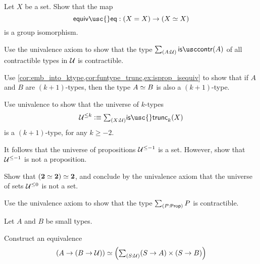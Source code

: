 \begin{exercises}
\item Let $X$ be a set. Show that the map
  \begin{equation*}
    \mathsf{equiv\usc{}eq} : (X=X)\to (\eqv{X}{X})
  \end{equation*}
  is a group isomorphism.
\item \label{ex:istrunc_UUtrunc}
\begin{subexenum}
\item Use the univalence axiom to show that the type $\sm{A:\UU}\iscontr(A)$ of all contractible types in $\mathcal{U}$ is contractible.
\item Use \cref{cor:emb_into_ktype,cor:funtype_trunc,ex:isprop_isequiv} to show that if $A$ and $B$ are $(k+1)$-types, then the type $\eqv{A}{B}$ is also a $(k+1)$-type.
\item Use univalence to show that the universe of $k$-types
\begin{equation*}
\UU^{\leq k}\defeq \sm{X:\UU}\mathsf{is\usc{}trunc}_k(X)
\end{equation*}
is a $(k+1)$-type, for any $k\geq -2$.
\item It follows that the universe of propositions $\mathcal{U}^{\leq-1}$ is a set. However, show that $\mathcal{U}^{\leq-1}$ is not a proposition.
\item Show that $\eqv{(\eqv{\bool}{\bool})}{\bool}$, and conclude by the univalence axiom that the universe of sets $\mathcal{U}^{\leq 0}$ is not a set. 
\end{subexenum}
\item Use the univalence axiom to show that the type $\sm{P:\prop}P$ is contractible.
\item Let $A$ and $B$ be small types. 
\begin{subexenum}
\item Construct an equivalence
\begin{equation*}
\eqv{(A\to (B\to\UU))}{\Big(\sm{S:\UU} (S\to A)\times (S\to B)\Big)}

\end{equation*}
\end{subexenum}
\end{exercises}
